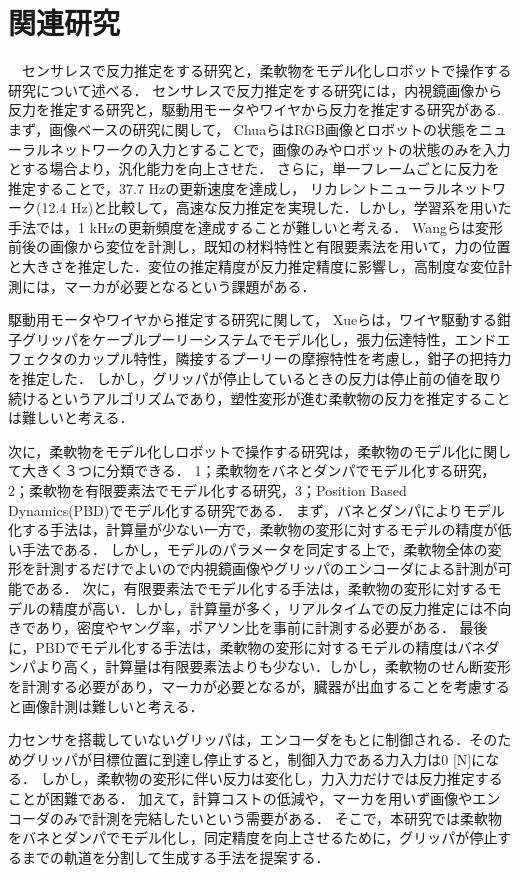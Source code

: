 \documentclass[a4paper]{jarticle}
\begin{document}
\section{関連研究}
　センサレスで反力推定をする研究と，柔軟物をモデル化しロボットで操作する研究について述べる．
センサレスで反力推定をする研究には，内視鏡画像から反力を推定する研究と，駆動用モータやワイヤから反力を推定する研究がある.
まず，画像ベースの研究に関して，
ChuaらはRGB画像とロボットの状態をニューラルネットワークの入力とすることで，画像のみやロボットの状態のみを入力とする場合より，汎化能力を向上させた\cite{ref_Chua}．
さらに，単一フレームごとに反力を推定することで，37.7 Hzの更新速度を達成し，
リカレントニューラルネットワーク(12.4 Hz)と比較して，高速な反力推定を実現した．しかし，学習系を用いた手法では，1 kHzの更新頻度を達成することが難しいと考える．
Wangらは変形前後の画像から変位を計測し，既知の材料特性と有限要素法を用いて，力の位置と大きさを推定した\cite{ref_Wang}．変位の推定精度が反力推定精度に影響し，高制度な変位計測には，マーカが必要となるという課題がある．

駆動用モータやワイヤから推定する研究に関して，
Xueらは，ワイヤ駆動する鉗子グリッパをケーブルプーリーシステムでモデル化し，張力伝達特性，エンドエフェクタのカップル特性，隣接するプーリーの摩擦特性を考慮し，鉗子の把持力を推定した\cite{ref_Xue}．
しかし，グリッパが停止しているときの反力は停止前の値を取り続けるというアルゴリズムであり，塑性変形が進む柔軟物の反力を推定することは難しいと考える．

次に，柔軟物をモデル化しロボットで操作する研究は，柔軟物のモデル化に関して大きく３つに分類できる\cite{ref_review_modeling}．
1；柔軟物をバネとダンパでモデル化する研究，2；柔軟物を有限要素法でモデル化する研究，3；Position Based Dynamics(PBD)でモデル化する研究である．
まず，バネとダンパによりモデル化する手法は，計算量が少ない一方で，柔軟物の変形に対するモデルの精度が低い手法である\cite{ref_MSD}．
しかし，モデルのパラメータを同定する上で，柔軟物全体の変形を計測するだけでよいので内視鏡画像やグリッパのエンコーダによる計測が可能である．
次に，有限要素法でモデル化する手法は，柔軟物の変形に対するモデルの精度が高い\cite{ref_FEM}．しかし，計算量が多く，リアルタイムでの反力推定には不向きであり，密度やヤング率，ポアソン比を事前に計測する必要がある．
最後に，PBDでモデル化する手法は，柔軟物の変形に対するモデルの精度はバネダンパより高く，計算量は有限要素法よりも少ない\cite{ref_PBD}．しかし，柔軟物のせん断変形を計測する必要があり，マーカが必要となるが，臓器が出血することを考慮すると画像計測は難しいと考える．

力センサを搭載していないグリッパは，エンコーダをもとに制御される．そのためグリッパが目標位置に到達し停止すると，制御入力である力入力は0 [N]になる．
しかし，柔軟物の変形に伴い反力は変化し，力入力だけでは反力推定することが困難である．
加えて，計算コストの低減や，マーカを用いず画像やエンコーダのみで計測を完結したいという需要がある．
そこで，本研究では柔軟物をバネとダンパでモデル化し，同定精度を向上させるために，グリッパが停止するまでの軌道を分割して生成する手法を提案する．
\end{document}
